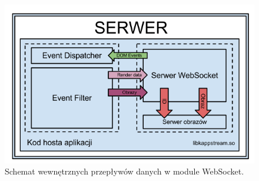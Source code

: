 
\begin{figure}
\centering
\includegraphics[width=0.8\linewidth]{img/arch-lib}
\caption{Schemat wewnętrznych przepływów danych w module WebSocket.}
\label{fig:arch-lib}
\end{figure}
